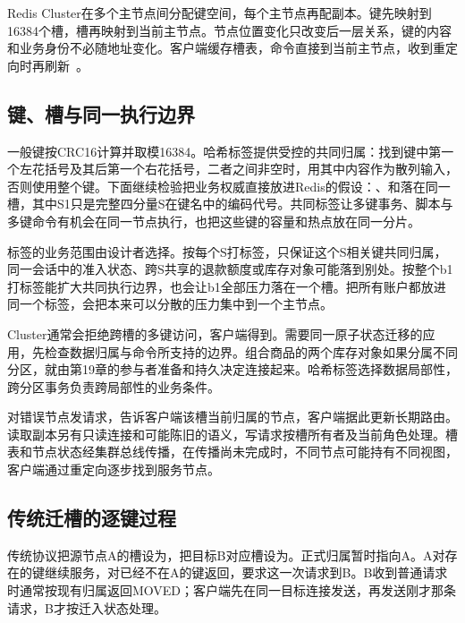 Redis Cluster在多个主节点间分配键空间，每个主节点再配副本。键先映射到16384个槽，槽再映射到当前主节点。节点位置变化只改变后一层关系，键的内容和业务身份不必随地址变化。客户端缓存槽表，命令直接到当前主节点，收到重定向时再刷新~\cite{redis-cluster-spec}。

\subsection{键、槽与同一执行边界}

一般键按CRC16计算并取模16384。哈希标签提供受控的共同归属：找到键中第一个左花括号及其后第一个右花括号，二者之间非空时，用其中内容作为散列输入，否则使用整个键。下面继续检验把业务权威直接放进Redis的假设：、和落在同一槽，其中S1只是完整四分量S在键名中的编码代号。共同标签让多键事务、脚本与多键命令有机会在同一节点执行，也把这些键的容量和热点放在同一分片。


标签的业务范围由设计者选择。按每个S打标签，只保证这个S相关键共同归属，同一会话中的准入状态、跨S共享的退款额度或库存对象可能落到别处。按整个b1打标签能扩大共同执行边界，也会让b1全部压力落在一个槽。把所有账户都放进同一个标签，会把本来可以分散的压力集中到一个主节点。

Cluster通常会拒绝跨槽的多键访问，客户端得到。需要同一原子状态迁移的应用，先检查数据归属与命令所支持的边界。组合商品的两个库存对象如果分属不同分区，就由第19章的参与者准备和持久决定连接起来。哈希标签选择数据局部性，跨分区事务负责跨局部性的业务条件。

对错误节点发请求，告诉客户端该槽当前归属的节点，客户端据此更新长期路由。读取副本另有只读连接和可能陈旧的语义，写请求按槽所有者及当前角色处理。槽表和节点状态经集群总线传播，在传播尚未完成时，不同节点可能持有不同视图，客户端通过重定向逐步找到服务节点。

\subsection{传统迁槽的逐键过程}

传统协议把源节点A的槽设为，把目标B对应槽设为。正式归属暂时指向A。A对存在的键继续服务，对已经不在A的键返回，要求这一次请求到B。B收到普通请求时通常按现有归属返回MOVED；客户端先在同一目标连接发送，再发送刚才那条请求，B才按迁入状态处理。


